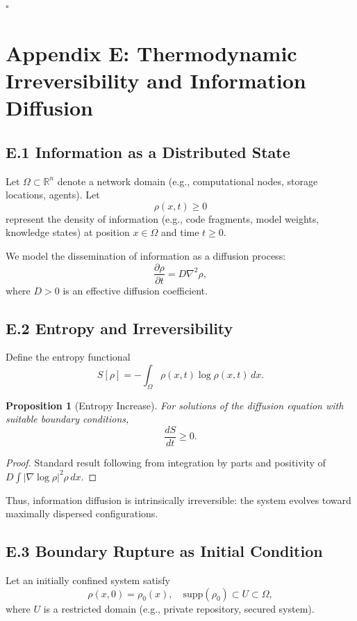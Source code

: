 \documentclass[12pt, oneside]{article}
\theoremstyle{plain}
\newtheorem{proposition}[theorem]{Proposition}
\theoremstyle{definition}
\theoremstyle{remark}
\begin{document}
\hfill $\square$

\section{Appendix E: Thermodynamic Irreversibility and Information Diffusion}

\subsection{E.1 Information as a Distributed State}

Let $\Omega \subset \mathbb{R}^n$ denote a network domain (e.g., computational nodes, storage locations, agents). Let
\[
\rho(x,t) \ge 0
\]
represent the density of information (e.g., code fragments, model weights, knowledge states) at position $x \in \Omega$ and time $t \ge 0$.

We model the dissemination of information as a diffusion process:
\[
\frac{\partial \rho}{\partial t} = D \nabla^2 \rho,
\]
where $D > 0$ is an effective diffusion coefficient.

\subsection{E.2 Entropy and Irreversibility}

Define the entropy functional
\[
S[\rho] = - \int_\Omega \rho(x,t) \log \rho(x,t)\, dx.
\]

\begin{proposition}[Entropy Increase]
For solutions of the diffusion equation with suitable boundary conditions,
\[
\frac{dS}{dt} \ge 0.
\]
\end{proposition}

\begin{proof}
Standard result following from integration by parts and positivity of $D \int |\nabla \log \rho|^2 \rho \, dx$.
\end{proof}

Thus, information diffusion is intrinsically irreversible: the system evolves toward maximally dispersed configurations.

\subsection{E.3 Boundary Rupture as Initial Condition}

Let an initially confined system satisfy
\[
\rho(x,0) = \rho_0(x), \quad \text{supp}(\rho_0) \subset U \subset \Omega,
\]
where $U$ is a restricted domain (e.g., private repository, secured system).
\end{document}
